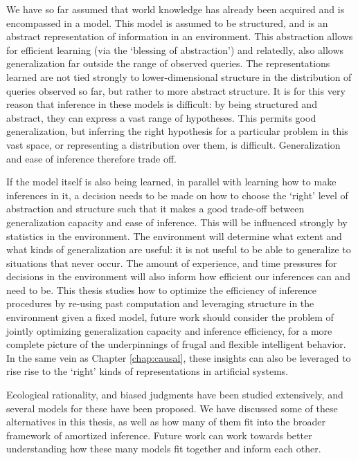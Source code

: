 We have so far assumed that world knowledge has already been acquired and is encompassed in a model. This model is assumed to be structured, and is an abstract representation of information in an environment. This abstraction allows for efficient learning (via the `blessing of abstraction'\cite{harlow1949formation, kemp2007learning, goodman1983fact}) and relatedly, also allows generalization far outside the range of observed queries. The representations learned are not tied strongly to lower-dimensional structure in the distribution of queries observed so far, but rather to more abstract structure. It is for this very reason that inference in these models is difficult: by being structured and abstract, they can express a vast range of hypotheses. This permits good generalization, but inferring the right hypothesis for a particular problem in this vast space, or representing a distribution over them, is difficult. Generalization and ease of inference therefore trade off. 

If the model itself is also being learned, in parallel with learning how to make inferences in it, a decision needs to be made on how to choose the `right' level of abstraction and structure such that it makes a good trade-off between generalization capacity and ease of inference. This will be influenced strongly by statistics in the environment. The environment will determine what extent and what kinds of generalization are useful: it is not useful to be able to generalize to situations that never occur. The amount of experience, and time pressures for decisions in the environment will also inform how efficient our inferences can and need to be. This thesis studies how to optimize the efficiency of inference procedures by re-using past computation and leveraging structure in the environment given a fixed model, future work should consider the problem of jointly optimizing generalization capacity and inference efficiency, for a more complete picture of the underpinnings of frugal and flexible intelligent behavior. In the same vein as Chapter \ref{chap:causal}, these insights can also be leveraged to rise rise to the `right' kinds of representations in artificial systems.

Ecological rationality, and biased judgments have been studied extensively, and several models for these have been proposed. We have discussed some of these alternatives in this thesis, as well as how many of them fit into the broader framework of amortized inference. Future work can work towards better understanding how these many models fit together and inform each other.

